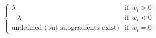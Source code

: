 \documentclass[preview]{standalone}
\begin{document}
\begin{align*}
\begin{cases}\lambda & \text{if } w_i > 0 \\-\lambda & \text{if } w_i < 0 \\\text{undefined (but subgradients exist)} & \text{if } w_i = 0\end{cases}
\end{align*}
\end{document}
